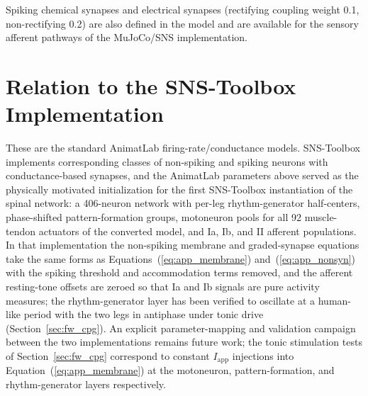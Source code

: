 Spiking chemical synapses and electrical synapses (rectifying coupling weight 0.1, non-rectifying 0.2) are also defined in the model and are available for the sensory afferent pathways of the MuJoCo/SNS implementation.

\section{Relation to the SNS-Toolbox Implementation}

These are the standard AnimatLab firing-rate/conductance models. SNS-Toolbox \citep{nourse_sns_2023} implements corresponding classes of non-spiking and spiking neurons with conductance-based synapses, and the AnimatLab parameters above served as the physically motivated initialization for the first SNS-Toolbox instantiation of the spinal network: a 406-neuron network with per-leg rhythm-generator half-centers, phase-shifted pattern-formation groups, motoneuron pools for all 92 muscle-tendon actuators of the converted model, and Ia, Ib, and II afferent populations. In that implementation the non-spiking membrane and graded-synapse equations take the same forms as Equations~(\ref{eq:app_membrane}) and~(\ref{eq:app_nonsyn}) with the spiking threshold and accommodation terms removed, and the afferent resting-tone offsets are zeroed so that Ia and Ib signals are pure activity measures; the rhythm-generator layer has been verified to oscillate at a human-like period with the two legs in antiphase under tonic drive (Section~\ref{sec:fw_cpg}). An explicit parameter-mapping and validation campaign between the two implementations remains future work; the tonic stimulation tests of Section~\ref{sec:fw_cpg} correspond to constant $I_{\text{app}}$ injections into Equation~(\ref{eq:app_membrane}) at the motoneuron, pattern-formation, and rhythm-generator layers respectively.



